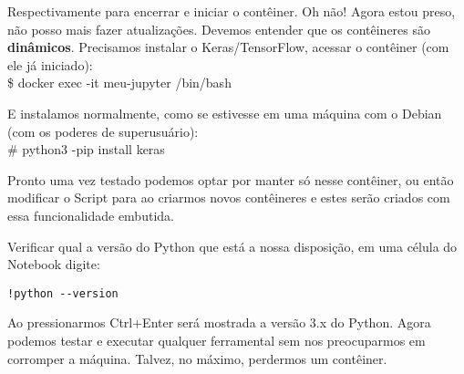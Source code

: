 Respectivamente para encerrar e iniciar o contêiner. Oh não! Agora estou preso, não posso mais fazer atualizações. Devemos entender que os contêineres são \textbf{dinâmicos}. Precisamos instalar o Keras/TensorFlow, acessar o contêiner (com ele já iniciado): \\
{\ttfamily\$ docker exec -it meu-jupyter /bin/bash}

E instalamos normalmente, como se estivesse em uma máquina com o Debian (com os poderes de superusuário): \\
{\ttfamily\# python3 -pip install keras}

Pronto uma vez testado podemos optar por manter só nesse contêiner, ou então modificar o Script para ao criarmos novos contêineres e estes serão criados com essa funcionalidade embutida.

Verificar qual a versão do Python que está a nossa disposição, em uma célula do Notebook digite:
\begin{lstlisting}[]
!python --version
\end{lstlisting}

Ao pressionarmos Ctrl+Enter será mostrada a versão 3.x do Python. Agora podemos testar e executar qualquer ferramental sem nos preocuparmos em corromper a máquina. Talvez, no máximo, perdermos um contêiner.
	
\clearpage